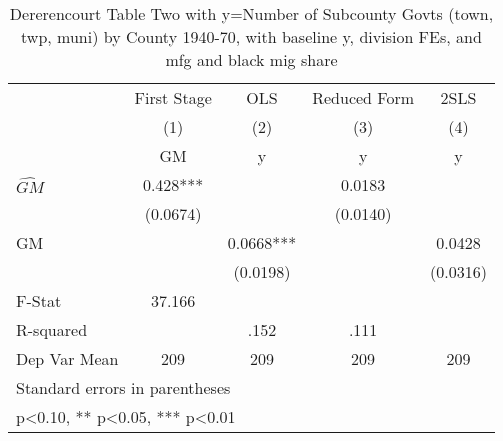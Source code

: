 \begin{table}[htbp]\centering
\def\sym#1{\ifmmode^{#1}\else\(^{#1}\)\fi}
\caption{Dererencourt Table Two with y=Number of Subcounty Govts (town, twp, muni) by County 1940-70, with baseline y, division FEs, and mfg and black mig share}
\begin{tabular}{l*{4}{c}}
\toprule
                    & First Stage   &         OLS   &Reduced Form   &        2SLS   \\
                    &\multicolumn{1}{c}{(1)}&\multicolumn{1}{c}{(2)}&\multicolumn{1}{c}{(3)}&\multicolumn{1}{c}{(4)}\\
                    &\multicolumn{1}{c}{GM}&\multicolumn{1}{c}{y}&\multicolumn{1}{c}{y}&\multicolumn{1}{c}{y}\\
\midrule
$\hat{GM}$          &       0.428***&               &      0.0183   &               \\
                    &    (0.0674)   &               &    (0.0140)   &               \\
\addlinespace
GM                  &               &      0.0668***&               &      0.0428   \\
                    &               &    (0.0198)   &               &    (0.0316)   \\
\midrule
F-Stat              &      37.166   &               &               &               \\
R-squared           &               &        .152   &        .111   &               \\
Dep Var Mean        &         209   &         209   &         209   &         209   \\
\bottomrule
\multicolumn{5}{l}{\footnotesize Standard errors in parentheses}\\
\multicolumn{5}{l}{\footnotesize * p<0.10, ** p<0.05, *** p<0.01}\\
\end{tabular}
\end{table}

